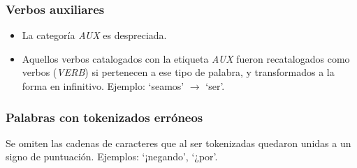 \subsubsection{Verbos auxiliares}
\begin{itemize}
    \item La categor\'ia \textit{AUX} es despreciada.
    \item Aquellos verbos catalogados con la etiqueta \textit{AUX} fueron
    recatalogados como verbos (\textit{VERB}) si pertenecen a ese tipo de
    palabra, y transformados a la forma en infinitivo. Ejemplo: `seamos' $\rightarrow$ `ser'.
\end{itemize}

\subsubsection{Palabras con tokenizados err\'oneos}
Se omiten las cadenas de caracteres que al ser tokenizadas quedaron unidas a un
signo de puntuaci\'on. Ejemplos: `¡negando', `¿por'.
